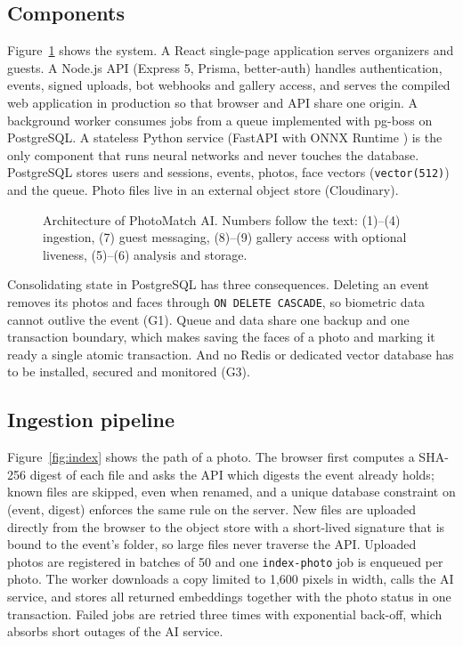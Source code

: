 \documentclass[conference]{IEEEtran}
\begin{document}
\subsection{Components}
Figure~\ref{fig:arch} shows the system. A React single-page application serves organizers and guests. A Node.js API (Express 5, Prisma, better-auth) handles authentication, events, signed uploads, bot webhooks and gallery access, and serves the compiled web application in production so that browser and API share one origin. A background worker consumes jobs from a queue implemented with pg-boss \cite{pgboss} on PostgreSQL. A stateless Python service (FastAPI with ONNX Runtime \cite{onnxruntime}) is the only component that runs neural networks and never touches the database. PostgreSQL stores users and sessions, events, photos, face vectors (\texttt{vector(512)}) and the queue. Photo files live in an external object store (Cloudinary).

\begin{figure}[!t]
\centering
\resizebox{0.97\textwidth}{!}{}
\caption{Architecture of PhotoMatch AI. Numbers follow the text: (1)--(4) ingestion, (7) guest messaging, (8)--(9) gallery access with optional liveness, (5)--(6) analysis and storage.}
\label{fig:arch}
\end{figure}

Consolidating state in PostgreSQL has three consequences. Deleting an event removes its photos and faces through \texttt{ON DELETE CASCADE}, so biometric data cannot outlive the event (G1). Queue and data share one backup and one transaction boundary, which makes saving the faces of a photo and marking it ready a single atomic transaction. And no Redis or dedicated vector database has to be installed, secured and monitored (G3).

\subsection{Ingestion pipeline}
Figure~\ref{fig:index} shows the path of a photo. The browser first computes a SHA-256 digest \cite{fips1804} of each file and asks the API which digests the event already holds; known files are skipped, even when renamed, and a unique database constraint on (event, digest) enforces the same rule on the server. New files are uploaded directly from the browser to the object store with a short-lived signature that is bound to the event's folder, so large files never traverse the API. Uploaded photos are registered in batches of 50 and one \texttt{index-photo} job is enqueued per photo. The worker downloads a copy limited to 1,600 pixels in width, calls the AI service, and stores all returned embeddings together with the photo status in one transaction. Failed jobs are retried three times with exponential back-off, which absorbs short outages of the AI service.
\end{document}
